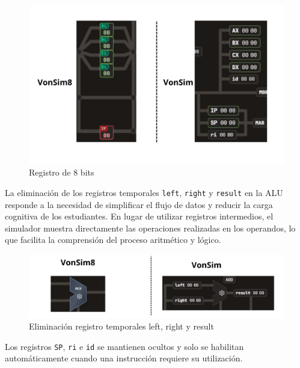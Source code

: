 \documentclass[12pt,oneside]{templates/unerthesis}
\begin{document}
\begin{figure}

{\centering \includegraphics[width=0.85\linewidth]{images/registros} 

}

\caption{Registro de 8 bits}\label{fig:registros}
\end{figure}

La eliminación de los registros temporales \texttt{left}, \texttt{right} y \texttt{result} en la ALU responde a la necesidad de simplificar el flujo de datos y reducir la carga cognitiva de los estudiantes. En lugar de utilizar registros intermedios, el simulador muestra directamente las operaciones realizadas en los operandos, lo que facilita la comprensión del proceso aritmético y lógico.

\begin{figure}

{\centering \includegraphics[width=0.85\linewidth]{images/leftrigth} 

}

\caption{Eliminación registro temporales left, right y result}\label{fig:leftrigth}
\end{figure}

Los registros \texttt{SP}, \texttt{ri} e \texttt{id} se mantienen ocultos y solo se habilitan automáticamente cuando una instrucción requiere su utilización.
\end{document}
